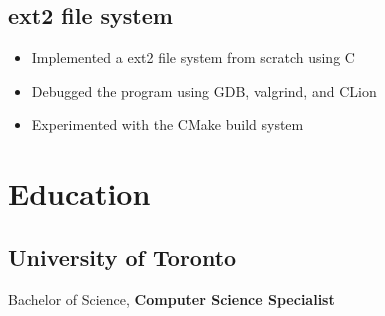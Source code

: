 \documentclass[letterpaper,12pt,oneside]{article}
\begin{document}
\subsection*{ext2 file system \hfill {}}
\begin{itemize}
      \setlength\itemsep{0em}
      \item Implemented a ext2 file system from scratch using C
      \item Debugged the program using GDB, valgrind, and CLion
      \item Experimented with the CMake build system
\end{itemize}

\section*{Education}
\subsection*{University of Toronto \hfill {}}
Bachelor of Science, \textbf{Computer Science Specialist}
\end{document}
